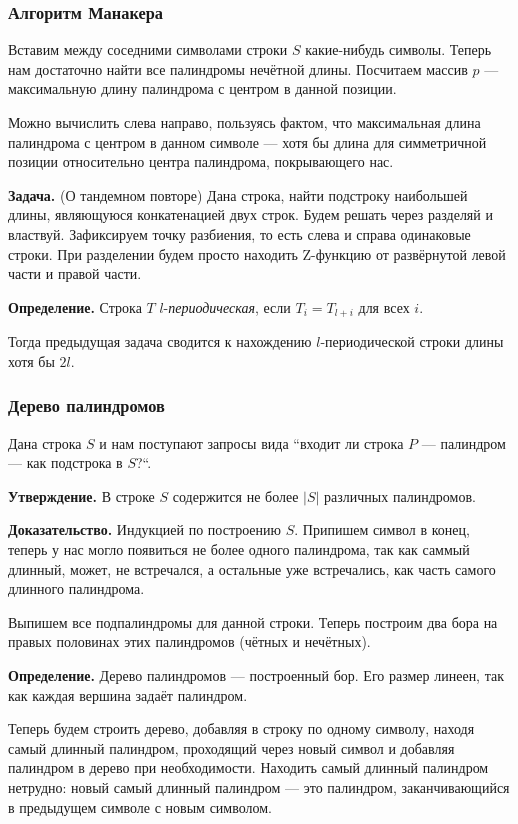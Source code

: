\subsubsection{Алгоритм Манакера}
Вставим между соседними символами строки $S$ какие-нибудь символы. Теперь нам достаточно найти все палиндромы нечётной длины.
Посчитаем массив $p$ --- максимальную длину палиндрома с центром в данной позиции.

Можно вычислить слева направо, пользуясь фактом, что максимальная длина палиндрома с центром в данном символе --- хотя бы длина для симметричной позиции относительно центра палиндрома, покрывающего нас.

\textbf{Задача.} (О тандемном повторе) Дана строка, найти подстроку наибольшей длины, являющуюся конкатенацией двух строк.
Будем решать через разделяй и властвуй. Зафиксируем точку разбиения, то есть слева и справа одинаковые строки.
При разделении будем просто находить Z-функцию от развёрнутой левой части и правой части.

\textbf{Определение.} Строка $T$ $l$-\textit{периодическая}, если $T_i = T_{l+i}$ для всех $i$.

Тогда предыдущая задача сводится к нахождению $l$-периодической строки длины хотя бы $2l$.

\subsubsection{Дерево палиндромов}
Дана строка $S$ и нам поступают запросы вида ``входит ли строка $P$ --- палиндром --- как подстрока в $S$?``.

\textbf{Утверждение.} В строке $S$ содержится не более $|S|$ различных палиндромов.

\textbf{Доказательство.} Индукцией по построению $S$. Припишем символ в конец, теперь у нас могло появиться не более одного палиндрома, так как саммый длинный, может, не встречался, а остальные уже встречались, как часть самого длинного палиндрома.

Выпишем все подпалиндромы для данной строки. Теперь построим два бора на правых половинах этих палиндромов (чётных и нечётных).

\textbf{Определение.} Дерево палиндромов --- построенный бор. Его размер линеен, так как каждая вершина задаёт палиндром.

Теперь будем строить дерево, добавляя в строку по одному символу, находя самый длинный палиндром, проходящий через новый символ и добавляя палиндром в дерево при необходимости.
Находить самый длинный палиндром нетрудно: новый самый длинный палиндром --- это палиндром, заканчивающийся в предыдущем символе с новым символом.


